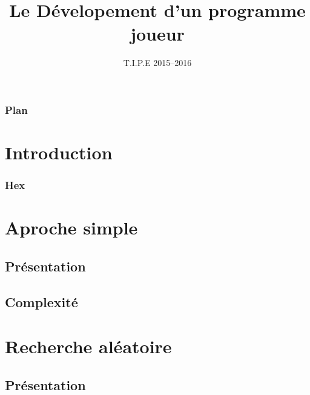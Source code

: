 \documentclass{beamer}
\title[Hex]{Le Dévelopement d'un programme joueur}
\date{T.I.P.E 2015--2016}
\begin{document}
\begin{frame}
  \titlepage
\end{frame}

\begin{frame}
  \frametitle{Plan}
  \tableofcontents
\end{frame}

\section{Introduction}

\begin{frame}
  \frametitle{Hex}
  \begin{HexBoard}[board size=10]
  \end{HexBoard}
\end{frame}

\section{Aproche simple}

\subsection{Présentation}


\subsection{Complexité}


\section{Recherche aléatoire}

\subsection{Présentation}
\end{document}
